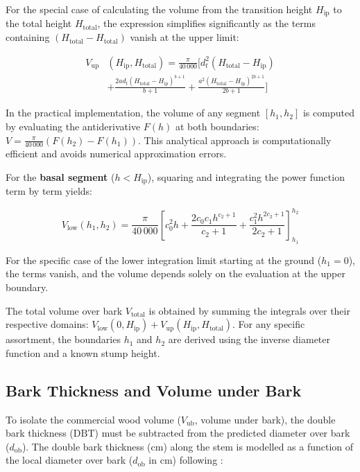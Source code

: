 \documentclass[twocolumn, bibliography=totoc]{scrartcl}
\begin{document}
For the special case of calculating the volume from the transition height $H_{\text{ip}}$ to the total height $H_{\text{total}}$, the expression simplifies significantly as the terms containing $(H_{\text{total}}-H_{\text{total}})$ vanish at the upper limit:

\begin{equation}
\begin{aligned}
  V_{\text{up}}&(H_{\text{ip}}, H_{\text{total}}) =  \frac{\pi}{40\,000} \Big[ d_t^2 (H_{\text{total}} - H_{\text{ip}}) \\
 &  +  \frac{2 a d_t (H_{\text{total}}-H_{\text{ip}})^{b+1}}{b+1} 
   + \frac{a^2 (H_{\text{total}}-H_{\text{ip}})^{2b+1}}{2b+1} \Big]
\end{aligned}
\end{equation}

In the practical implementation, the volume of any segment $[h_1, h_2]$ is computed by evaluating the antiderivative $F(h)$ at both boundaries: $V = \frac{\pi}{40\,000} (F(h_2) - F(h_1))$. This analytical approach is computationally efficient and avoids numerical approximation errors.


For the \textbf{basal segment} ($h < H_{\text{ip}}$), squaring and integrating the power function term by term yields:

\begin{equation}
V_{\text{low}}(h_1, h_2) = \frac{\pi}{40\,000} \left[ c_0^2 h + \frac{2c_0 c_1 h^{c_2+1}}{c_2+1} + \frac{c_1^2 h^{2c_2+1}}{2c_2+1} \right]_{h_1}^{h_2}
\end{equation}

For the specific case of the lower integration limit starting at the ground ($h_1 = 0$), the terms vanish, and the volume depends solely on the evaluation at the upper boundary.

The total volume over bark $V_{\text{total}}$ is obtained by summing the integrals over their respective domains: $V_{\text{low}}(0, H_{\text{ip}}) + V_{\text{up}}(H_{\text{ip}}, H_{\text{total}})$. For any specific assortment, the boundaries $h_1$ and $h_2$ are derived using the inverse diameter function and a known stump height.

\subsection{Bark Thickness and Volume under Bark}

To isolate the commercial wood volume ($V_{\text{ub}}$, volume under bark), the double bark thickness ($\text{DBT}$) must be subtracted from the predicted diameter over bark ($d_{\text{ob}}$). The double bark thickness (\unit{cm}) along the stem is modelled as a function of the local diameter over bark ($d_{\text{ob}}$ in \unit{cm}) following \citet{roessler2008}:
\end{document}

